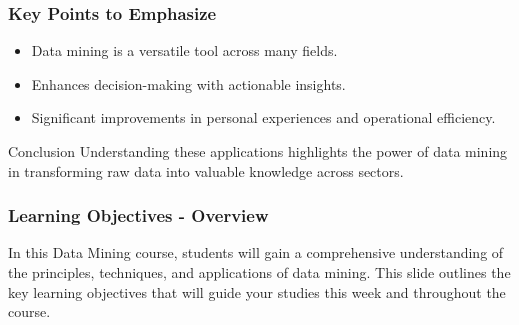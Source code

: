 \documentclass[aspectratio=169]{beamer}
\begin{document}
\begin{frame}[fragile]
    \frametitle{Key Points to Emphasize}
    \begin{itemize}
        \item Data mining is a versatile tool across many fields.
        \item Enhances decision-making with actionable insights.
        \item Significant improvements in personal experiences and operational efficiency.
    \end{itemize}
    
    \begin{block}{Conclusion}
        Understanding these applications highlights the power of data mining in transforming raw data into valuable knowledge across sectors.
    \end{block}
\end{frame}

\begin{frame}[fragile]
    \frametitle{Learning Objectives - Overview}
    In this Data Mining course, students will gain a comprehensive understanding of the principles, techniques, and applications of data mining. This slide outlines the key learning objectives that will guide your studies this week and throughout the course.
\end{frame}
\end{document}
